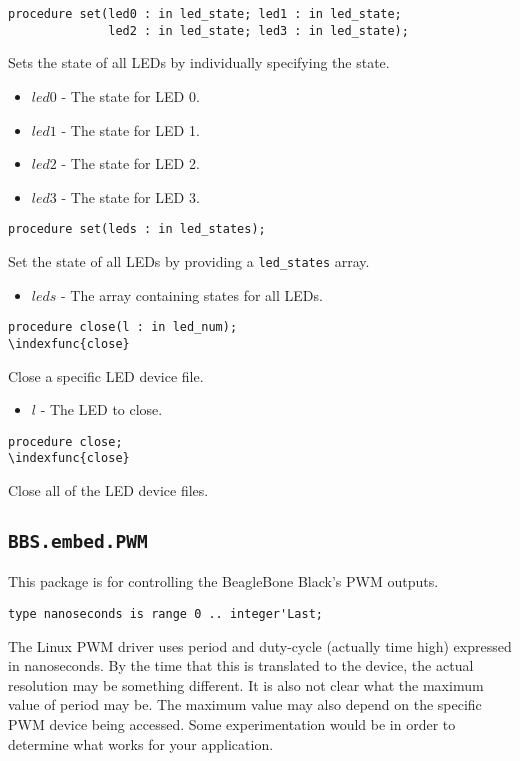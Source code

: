 \documentclass[10pt, openany]{book}
\newcommand{\indextype}[1]{\index[type]{#1}}
\newcommand{\indexfunc}[1]{\index[func]{#1}}
\newcommand{\package}[1]{\texttt{#1}}
\newcommand{\datatype}[1]{\texttt{#1}}
\begin{document}
\begin{lstlisting}
procedure set(led0 : in led_state; led1 : in led_state;
              led2 : in led_state; led3 : in led_state);
\end{lstlisting}
\indexfunc{set}
Sets the state of all LEDs by individually specifying the state.
\begin{itemize}
  \item $led0$ - The state for LED 0.
  \item $led1$ - The state for LED 1.
  \item $led2$ - The state for LED 2.
  \item $led3$ - The state for LED 3.
\end{itemize}

\begin{lstlisting}
procedure set(leds : in led_states);
\end{lstlisting}
\indexfunc{set}
Set the state of all LEDs by providing a \datatype{led\_states} array.
\begin{itemize}
  \item $leds$ - The array containing states for all LEDs.
\end{itemize}

\begin{lstlisting}
procedure close(l : in led_num);
\indexfunc{close}
\end{lstlisting}
Close a specific LED device file.
\begin{itemize}
  \item $l$ - The LED to close.
\end{itemize}

\begin{lstlisting}
procedure close;
\indexfunc{close}
\end{lstlisting}
Close all of the LED device files.

\subsection{\package{BBS.embed.PWM}}
This package is for controlling the BeagleBone Black's PWM outputs.

\begin{lstlisting}
type nanoseconds is range 0 .. integer'Last;
\end{lstlisting}
\indextype{nanoseconds}
The Linux PWM driver uses period and duty-cycle (actually time high) expressed  in nanoseconds.  By the time that this is translated to the device, the  actual resolution may be something different.  It is also not clear what  the maximum value of period may be.  The maximum value may also depend on  the specific PWM device being accessed.  Some experimentation would be in  order to determine what works for your application.
\end{document}

